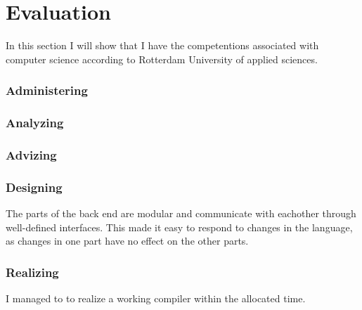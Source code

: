 \section{Evaluation}\label{evaluation}
In this section I will show that I have the competentions associated with computer science according to Rotterdam University of applied sciences.

\subsubsection{Administering}


\subsubsection{Analyzing}

\subsubsection{Advizing}


\subsubsection{Designing}
The parts of the back end are modular and communicate with eachother through well-defined interfaces.
This made it easy to respond to changes in the language, as changes in one part have no effect on the other parts.

\subsubsection{Realizing}
I managed to to realize a working compiler within the allocated time.
